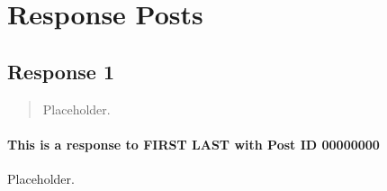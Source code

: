 
\section{Response Posts}
  \subsection{Response 1}
    \begin{quotation}
      Placeholder.
    \end{quotation}

    \paragraph{This is a response to FIRST LAST with Post ID 00000000}
    Placeholder.
